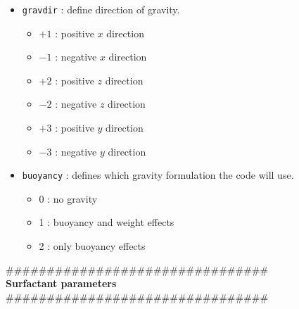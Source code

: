 \begin{itemize}[label={$\circ$}]
\begin{enumerate}
\item 3D drop array; accepted input values are radius of the single drop, height of the drop array ($z$ coordinate), number of drops in $x$ direction and number of drops in $y$ direction. The distance among two drop centers must be at least 2(radius+5$\sqrt{2}\Ch$), otherwise the number of drops will be reduced to fit this constraint.
\end{enumerate}
\item \texttt{gravdir} : define direction of gravity.
\begin{itemize}[label={$\circ$}]
\item $+1$ : positive $x$ direction
\item $-1$ : negative $x$ direction
\item $+2$ : positive $z$ direction
\item $-2$ : negative $z$ direction
\item $+3$ : positive $y$ direction
\item $-3$ : negative $y$ direction
\end{itemize}
\item \texttt{buoyancy} : defines which gravity formulation the code will use.
\begin{itemize}[label={$\circ$}]
\item 0 : no gravity
\item 1 : buoyancy and weight effects
\item 2 : only buoyancy effects
\end{itemize}
\end{itemize}
\#\#\#\#\#\#\#\#\#\#\#\#\#\#\#\#\#\#\#\#\#\#\#\#\#\#\#\#\#\#\#\#\\
{\bf Surfactant parameters}\\
\#\#\#\#\#\#\#\#\#\#\#\#\#\#\#\#\#\#\#\#\#\#\#\#\#\#\#\#\#\#\#\#
